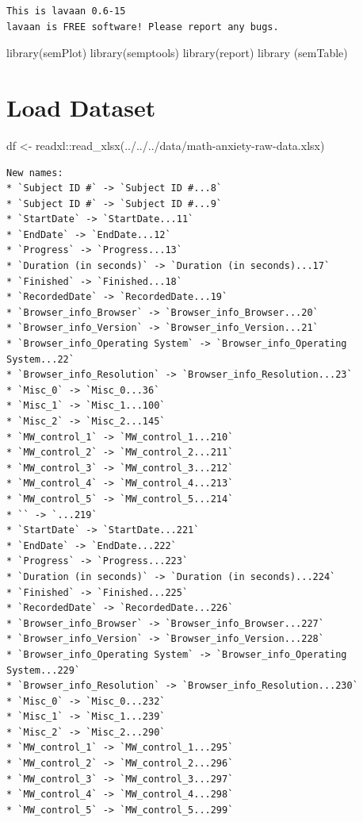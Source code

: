\documentclass[
  letterpaper,
  DIV=11,
  numbers=noendperiod]{scrartcl}
\newenvironment{Shaded}{\begin{snugshade}}{\end{snugshade}}
\newcommand{\FunctionTok}[1]{\textcolor[rgb]{0.28,0.35,0.67}{#1}}
\newcommand{\NormalTok}[1]{\textcolor[rgb]{0.00,0.23,0.31}{#1}}
\newcommand{\OtherTok}[1]{\textcolor[rgb]{0.00,0.23,0.31}{#1}}
\newcommand{\SpecialCharTok}[1]{\textcolor[rgb]{0.37,0.37,0.37}{#1}}
\newcommand{\StringTok}[1]{\textcolor[rgb]{0.13,0.47,0.30}{#1}}
\begin{document}
\begin{verbatim}
This is lavaan 0.6-15
lavaan is FREE software! Please report any bugs.
\end{verbatim}

\begin{Shaded}
\begin{Highlighting}[]
\FunctionTok{library}\NormalTok{(semPlot)}
\FunctionTok{library}\NormalTok{(semptools)}
\FunctionTok{library}\NormalTok{(report)}
\FunctionTok{library}\NormalTok{ (semTable)}
\end{Highlighting}
\end{Shaded}

\hypertarget{load-dataset}{%
\section{Load Dataset}\label{load-dataset}}

\begin{Shaded}
\begin{Highlighting}[]
\NormalTok{df }\OtherTok{\textless{}{-}}\NormalTok{ readxl}\SpecialCharTok{::}\FunctionTok{read\_xlsx}\NormalTok{(}\StringTok{\textquotesingle{}../../../data/math{-}anxiety{-}raw{-}data.xlsx\textquotesingle{}}\NormalTok{)}
\end{Highlighting}
\end{Shaded}

\begin{verbatim}
New names:
* `Subject ID #` -> `Subject ID #...8`
* `Subject ID #` -> `Subject ID #...9`
* `StartDate` -> `StartDate...11`
* `EndDate` -> `EndDate...12`
* `Progress` -> `Progress...13`
* `Duration (in seconds)` -> `Duration (in seconds)...17`
* `Finished` -> `Finished...18`
* `RecordedDate` -> `RecordedDate...19`
* `Browser_info_Browser` -> `Browser_info_Browser...20`
* `Browser_info_Version` -> `Browser_info_Version...21`
* `Browser_info_Operating System` -> `Browser_info_Operating System...22`
* `Browser_info_Resolution` -> `Browser_info_Resolution...23`
* `Misc_0` -> `Misc_0...36`
* `Misc_1` -> `Misc_1...100`
* `Misc_2` -> `Misc_2...145`
* `MW_control_1` -> `MW_control_1...210`
* `MW_control_2` -> `MW_control_2...211`
* `MW_control_3` -> `MW_control_3...212`
* `MW_control_4` -> `MW_control_4...213`
* `MW_control_5` -> `MW_control_5...214`
* `` -> `...219`
* `StartDate` -> `StartDate...221`
* `EndDate` -> `EndDate...222`
* `Progress` -> `Progress...223`
* `Duration (in seconds)` -> `Duration (in seconds)...224`
* `Finished` -> `Finished...225`
* `RecordedDate` -> `RecordedDate...226`
* `Browser_info_Browser` -> `Browser_info_Browser...227`
* `Browser_info_Version` -> `Browser_info_Version...228`
* `Browser_info_Operating System` -> `Browser_info_Operating System...229`
* `Browser_info_Resolution` -> `Browser_info_Resolution...230`
* `Misc_0` -> `Misc_0...232`
* `Misc_1` -> `Misc_1...239`
* `Misc_2` -> `Misc_2...290`
* `MW_control_1` -> `MW_control_1...295`
* `MW_control_2` -> `MW_control_2...296`
* `MW_control_3` -> `MW_control_3...297`
* `MW_control_4` -> `MW_control_4...298`
* `MW_control_5` -> `MW_control_5...299`
\end{verbatim}
\end{document}
